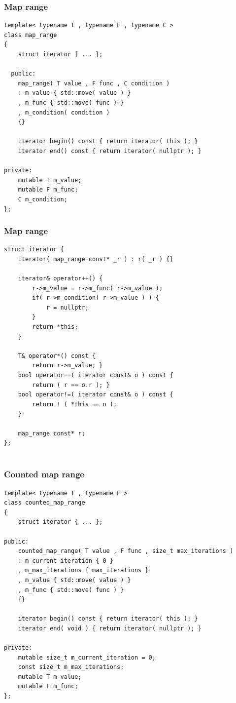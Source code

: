 \documentclass{beamer}
\newcommand{\heading}[1]{\frametitle{#1}}
\begin{document}
\begin{frame}[fragile]
  \heading{Map range}
  
\begin{lstlisting}[basicstyle=\scriptsize\ttfamily]
template< typename T , typename F , typename C >
class map_range
{
    struct iterator { ... };

  public:
    map_range( T value , F func , C condition )
    : m_value { std::move( value ) }
    , m_func { std::move( func ) }
    , m_condition( condition )
    {}
    
    iterator begin() const { return iterator( this ); }
    iterator end() const { return iterator( nullptr ); }
    
private:
    mutable T m_value;
    mutable F m_func;
    C m_condition;
};
\end{lstlisting}

\end{frame}


\begin{frame}[fragile]
  \heading{Map range}
  
\begin{lstlisting}[basicstyle=\scriptsize\ttfamily]
struct iterator {
    iterator( map_range const* _r ) : r( _r ) {}
    
    iterator& operator++() {
        r->m_value = r->m_func( r->m_value );
        if( r->m_condition( r->m_value ) ) {
            r = nullptr;
        }
        return *this;
    }
    
    T& operator*() const {
        return r->m_value; }
    bool operator==( iterator const& o ) const {
        return ( r == o.r ); }
    bool operator!=( iterator const& o ) const {
        return ! ( *this == o );
    }
    
    map_range const* r;
};
 
\end{lstlisting}

\end{frame}



\begin{frame}[fragile]
  \heading{Counted map range}
  
\begin{lstlisting}[basicstyle=\scriptsize\ttfamily]
template< typename T , typename F >
class counted_map_range
{
    struct iterator { ... };
    
public:
    counted_map_range( T value , F func , size_t max_iterations )
    : m_current_iteration { 0 }
    , m_max_iterations { max_iterations }
    , m_value { std::move( value ) }
    , m_func { std::move( func ) }
    {}
    
    iterator begin() const { return iterator( this ); }
    iterator end( void ) { return iterator( nullptr ); }
    
private:
    mutable size_t m_current_iteration = 0;
    const size_t m_max_iterations;
    mutable T m_value;
    mutable F m_func;
};
\end{lstlisting}

\end{frame}
\end{document}
